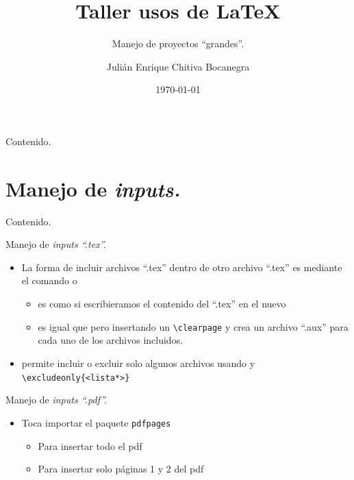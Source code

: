 \documentclass[dvipsnames,xcolor=x11names, handout]{beamer}
\title{Taller usos de \LaTeX}
\subtitle{Manejo de proyectos ``grandes''.}
\author[Julián Chitiva Bocanegra]{Julián Enrique Chitiva Bocanegra}
\institute[Uniandes] 
{Universidad de los Andes\\ Facultad de Economía}
\date{\today}
\theoremstyle{plain}
\theoremstyle{definition}
\begin{document}
\begin{frame}
  \titlepage
\end{frame}

\begin{frame}{Contenido.}
  \tableofcontents%
\end{frame}
\section{Manejo de \itshape inputs.}
\begin{frame}{Contenido.}
  \tableofcontents[currentsection]
\end{frame}

\begin{frame}[fragile]{Manejo de \itshape inputs \normalfont ``.tex''.}
\begin{itemize}
    \item La forma de incluir archivos ``.tex'' dentro de otro archivo ``.tex'' es mediante el comando \verb!! o \verb!!
    \begin{itemize}
    \item \verb!! es como si escribieramos el contenido del ``.tex'' en el nuevo
    \item \verb!! es igual que \verb!! pero insertando un \verb!\clearpage! y crea un archivo ``.aux'' para cada uno de los archivos incluidos.
    \end{itemize}
    \item \verb!! permite incluir o excluir solo algunos archivos usando \verb!! y \verb!\excludeonly{<lista*>}!
\end{itemize}
\end{frame}

\begin{frame}[fragile]{Manejo de \itshape inputs \normalfont ``.pdf''.}
\begin{itemize}
    \item Toca importar el paquete \verb!pdfpages!
    \begin{itemize}[<+->]
        \item Para insertar todo el pdf \verb!!
        \item Para insertar solo páginas 1 y 2 del pdf \verb!!
    \end{itemize}
\end{itemize}

\end{frame}
\end{document}
